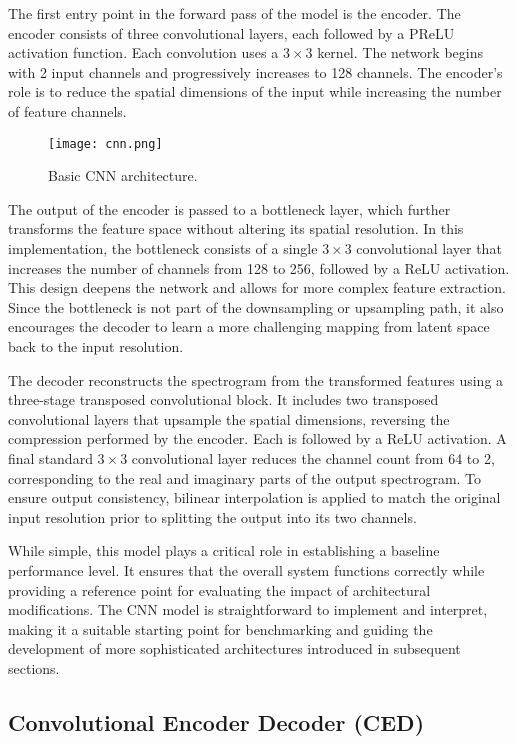 The first entry point in the forward pass of the model is the encoder. The encoder consists of three convolutional layers, each followed by a PReLU activation function. Each convolution uses a \(3 \times 3\) kernel. The network begins with 2 input channels and progressively increases to 128 channels. The encoder's role is to reduce the spatial dimensions of the input while increasing the number of feature channels.

\begin{figure}[h]
    \centering
    \texttt{[image: cnn.png]}
    \caption{\label{fig:cnn}Basic CNN architecture.}
\end{figure}

The output of the encoder is passed to a bottleneck layer, which further transforms the feature space without altering its spatial resolution. In this implementation, the bottleneck consists of a single \(3 \times 3\) convolutional layer that increases the number of channels from 128 to 256, followed by a ReLU activation. This design deepens the network and allows for more complex feature extraction. Since the bottleneck is not part of the downsampling or upsampling path, it also encourages the decoder to learn a more challenging mapping from latent space back to the input resolution.

The decoder reconstructs the spectrogram from the transformed features using a three-stage transposed convolutional block. It includes two transposed convolutional layers that upsample the spatial dimensions, reversing the compression performed by the encoder. Each is followed by a ReLU activation. A final standard \(3 \times 3\) convolutional layer reduces the channel count from 64 to 2, corresponding to the real and imaginary parts of the output spectrogram. To ensure output consistency, bilinear interpolation is applied to match the original input resolution prior to splitting the output into its two channels.

While simple, this model plays a critical role in establishing a baseline performance level. It ensures that the overall system functions correctly while providing a reference point for evaluating the impact of architectural modifications. The CNN model is straightforward to implement and interpret, making it a suitable starting point for benchmarking and guiding the development of more sophisticated architectures introduced in subsequent sections.

\subsection{Convolutional Encoder Decoder (CED)}
\label{sec:ced}

